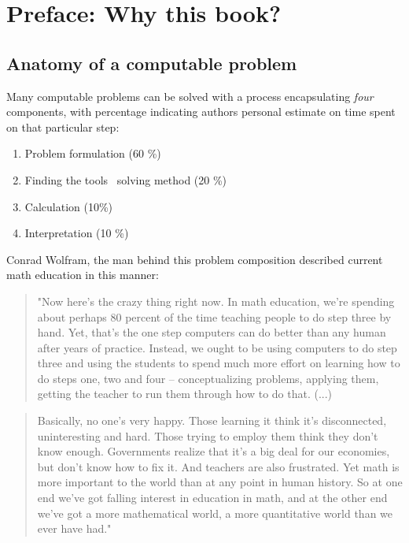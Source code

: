 \documentclass[pdftex, 12pt, a4paper]{report}
\begin{document}
	
	\tableofcontents
	
	\chapter{Preface: Why this book?}	
	\section{Anatomy of a computable problem}
	
	Many computable problems can be solved with a process encapsulating \textit{four} components, with percentage indicating authors personal estimate on time spent on that particular step:
	
	\begin{enumerate}
		\item Problem formulation (60 \%)
		\item Finding the tools \ solving method (20 \%)
		\item Calculation (10\%)
		\item Interpretation (10 \%)
	\end{enumerate}
	
	Conrad Wolfram, the man behind this problem composition described current math education in this manner: 
	\begin{quote}
		"Now here's the crazy thing right now. In math education, we're spending about perhaps 80 percent of the time teaching people to do step three by hand. Yet, that's the one step computers can do better than any human after years of practice. Instead, we ought to be using computers to do step three and using the students to spend much more effort on learning how to do steps one, two and four -- conceptualizing problems, applying them, getting the teacher to run them through how to do that. (...)
	\end{quote}
	
	\begin{quote}
	 Basically, no one's very happy. Those learning it think it's disconnected, uninteresting and hard. Those trying to employ them think they don't know enough. Governments realize that it's a big deal for our economies, but don't know how to fix it. And teachers are also frustrated. Yet math is more important to the world than at any point in human history. So at one end we've got falling interest in education in math, and at the other end we've got a more mathematical world, a more quantitative world than we ever have had."
	\end{quote}
		
\end{document}
